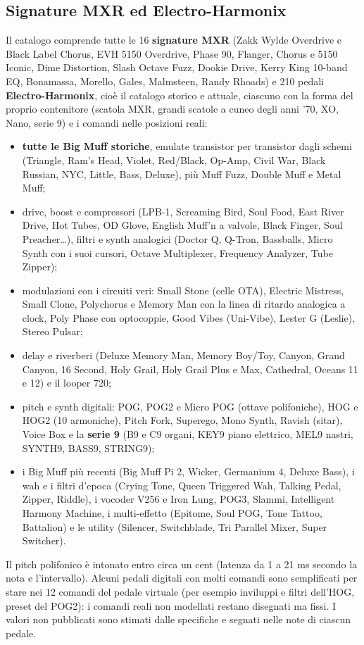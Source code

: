 \documentclass[11pt,a4paper]{article}
\begin{document}
\subsection{Signature MXR ed Electro-Harmonix}
Il catalogo comprende tutte le 16 \textbf{signature MXR} (Zakk Wylde Overdrive e Black Label Chorus, EVH 5150
Overdrive, Phase 90, Flanger, Chorus e 5150 Iconic, Dime Distortion, Slash Octave Fuzz, Dookie Drive, Kerry King
10-band EQ, Bonamassa, Morello, Gales, Malmsteen, Randy Rhoads) e 210 pedali \textbf{Electro-Harmonix},
cioè il catalogo storico e attuale, ciascuno con la forma del proprio contenitore (scatola MXR, grandi scatole a cuneo
degli anni '70, XO, Nano, serie 9) e i comandi nelle posizioni reali:
\begin{itemize}
  \item \textbf{tutte le Big Muff storiche}, emulate transistor per transistor dagli schemi (Triangle, Ram's
        Head, Violet, Red/Black, Op-Amp, Civil War, Black Russian, NYC, Little, Bass, Deluxe), più Muff Fuzz,
        Double Muff e Metal Muff;
  \item drive, boost e compressori (LPB-1, Screaming Bird, Soul Food, East River Drive, Hot Tubes, OD Glove,
        English Muff'n a valvole, Black Finger, Soul Preacher\dots), filtri e synth analogici (Doctor Q, Q-Tron,
        Bassballs, Micro Synth con i suoi cursori, Octave Multiplexer, Frequency Analyzer, Tube Zipper);
  \item modulazioni con i circuiti veri: Small Stone (celle OTA), Electric Mistress, Small Clone, Polychorus e
        Memory Man con la linea di ritardo analogica a clock, Poly Phase con optocoppie, Good Vibes (Uni-Vibe),
        Lester G (Leslie), Stereo Pulsar;
  \item delay e riverberi (Deluxe Memory Man, Memory Boy/Toy, Canyon, Grand Canyon, 16 Second, Holy Grail,
        Holy Grail Plus e Max, Cathedral, Oceans 11 e 12) e il looper 720;
  \item pitch e synth digitali: POG, POG2 e Micro POG (ottave polifoniche), HOG e HOG2 (10 armoniche),
        Pitch Fork, Superego, Mono Synth, Ravish (sitar), Voice Box e la \textbf{serie 9} (B9 e C9 organi, KEY9
        piano elettrico, MEL9 nastri, SYNTH9, BASS9, STRING9);
  \item i Big Muff più recenti (Big Muff Pi 2, Wicker, Germanium 4, Deluxe Bass), i wah e i filtri d'epoca
        (Crying Tone, Queen Triggered Wah, Talking Pedal, Zipper, Riddle), i vocoder V256 e Iron Lung, POG3,
        Slammi, Intelligent Harmony Machine, i multi-effetto (Epitome, Soul POG, Tone Tattoo, Battalion) e le
        utility (Silencer, Switchblade, Tri Parallel Mixer, Super Switcher).
\end{itemize}
Il pitch polifonico è intonato entro circa un cent (latenza da 1 a 21 ms secondo la nota e l'intervallo).
Alcuni pedali digitali con molti comandi sono semplificati per stare nei 12 comandi del pedale virtuale
(per esempio inviluppi e filtri dell'HOG, preset del POG2): i comandi reali non modellati restano disegnati
ma fissi. I valori non pubblicati sono stimati dalle specifiche e segnati nelle note di ciascun pedale.
\end{document}

